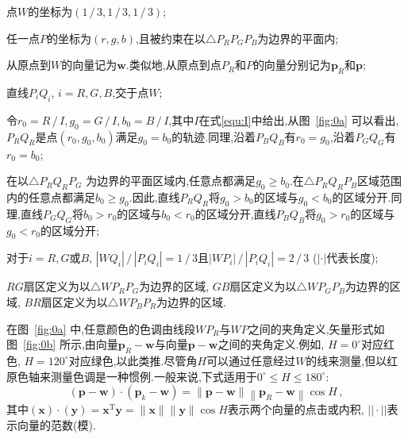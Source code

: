 \begin{compactenum}[\hspace{2em}(a)]
  \item 点$W$的坐标为$(1\,/\,3,1\,/\,3,1\,/\,3)$;\label{enum:a}
  \item 任一点$P$的坐标为$(r,g,b)$,且被约束在以$\triangle P_RP_GP_B$为边界的平面内;\label{enum:b}
  \item 从原点到$W$的向量记为$\symbf{w}$.类似地,从原点到点$P_R$和$P$的向量分别记为$\symbf{p}_R$和$\symbf{p}$;
  \item 直线$P_iQ_i$, $i=R,G,B$,交于点$W$;
  \item 令$r_0=R\,/\,I,g_0=G\,/\,I,b_0=B\,/\,I$,其中$I$在式\eqref{equ:I}中给出,从图~\ref{fig:0a} 可以看出, $P_RQ_R$是点$(r_0,g_0,b_0)$满足$g_0=b_0$的轨迹.同理,沿着$P_B Q_B$有$r_0=g_0$,沿着$P_G Q_G$有$r_0=b_0$;\label{enum:e}
  \item 在以$\triangle P_RQ_RP_G$ 为边界的平面区域内,任意点都满足$g_0\geqslant b_0$.在$\triangle P_RQ_RP_B$区域范围内的任意点都满足$b_0\geqslant g_0$.因此,直线$P_RQ_R$将$g_0 > b_0$的区域与$g_0 <b_0$的区域分开.同理,直线$P_GQ_G$将$b_0 > r_0$的区域与$b_0 <r_0$的区域分开,直线$P_BQ_B$将$g_0 > r_0$的区域与$g_0 <r_0$的区域分开;
  \item 对于$i=R,G$或$B$, $\left|W Q_{i}\right| \,/\,\left|P_{i} Q_{i}\right|=1 \,/\, 3$且$\left|W P_{i}\right| \,/\,\left|P_{i} Q_{i}\right|=2 \,/\, 3$ ($|\cdot|$代表长度);\label{enum:d}
  \item $RG$扇区定义为以$\triangle  WP_RP_G$为边界的区域, $GB$扇区定义为以$\triangle  WP_GP_B$为边界的区域, $BR$扇区定义为以$\triangle  WP_BP_R$为边界的区域.
\end{compactenum}

在图~\ref{fig:0a} 中,任意颜色的色调由线段$WP_R$与$WP$之间的夹角定义,矢量形式如图~\ref{fig:0b} 所示,由向量$\symbf{p}_R -\symbf{w}$与向量$\symbf{p}-\symbf{w}$之间的夹角定义.例如, $H=0^{\circ}$对应红色, $H=120^{\circ}$对应绿色,以此类推.尽管角$H$可以通过任意经过$W$的线来测量,但以红原色轴来测量色调是一种惯例.一般来说,下式适用于$0^{\circ}\leqslant H \leqslant 180^{\circ}$:
\begin{equation}\label{equ:6}
  (\symbf{p}-\symbf{w}) \cdot\left(\symbf{p}_{k}-\symbf{w}\right)=\|\symbf{p}-\symbf{w}\|\left\|\symbf{p}_{R}-\symbf{w}\right\| \cos H\,,
\end{equation}
其中$(\symbf{x}) \cdot(\symbf{y})=\symbf{x}^{\mathrm{T}} \symbf{y}=\|\symbf{x}\|\|\symbf{y}\| \cos H$表示两个向量的点击或内积, $||\cdot ||$表示向量的范数(模).

